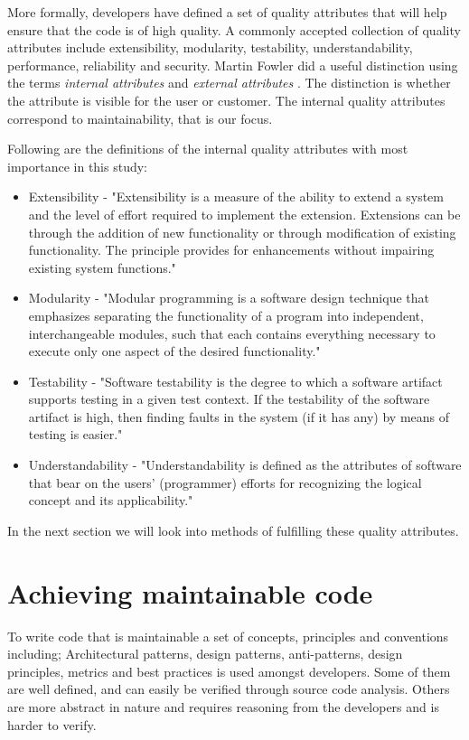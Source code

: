 \documentclass{report}
\begin{document}
More formally, developers have defined a set of quality attributes that will help ensure that the code is of high quality. A commonly accepted collection of quality attributes include extensibility, modularity, testability, understandability, performance, reliability and security. Martin Fowler did a useful distinction using the terms \textit{internal attributes} and \textit{external attributes} \cite{internalExternal}. The distinction is whether the attribute is visible for the user or customer. The internal quality attributes correspond to maintainability, that is our focus. 

Following are the definitions of the internal quality attributes with most importance in this study:
\begin{itemize}
	\item Extensibility - "Extensibility is a measure of the ability to extend a system and the level of effort required to implement the extension. Extensions can be through the addition of new functionality or through modification of existing functionality. The principle provides for enhancements without impairing existing system functions." \cite{Extensib83:online}
    	\item Modularity - "Modular programming is a software design technique that emphasizes separating the functionality of a program into independent, interchangeable modules, such that each contains everything necessary to execute only one aspect of the desired functionality." \cite{Modularp60:online}
	\item Testability - "Software testability is the degree to which a software artifact supports testing in a given test context. If the testability of the software artifact is high, then finding faults in the system (if it has any) by means of testing is easier." \cite{Software40:online}
	\item Understandability - "Understandability is defined as the attributes of software that bear on the users' (programmer) efforts for recognizing the logical concept and its applicability." \cite{Understa26:online}
\end{itemize}

In the next section we will look into methods of fulfilling these quality attributes.

\section{Achieving maintainable code}
To write code that is maintainable a set of concepts, principles and conventions including; Architectural patterns, design patterns, anti-patterns, design principles, metrics and best practices is used amongst developers. Some of them are well defined, and can easily be verified through source code analysis. Others are more abstract in nature and requires reasoning from the developers and is harder to verify.
\end{document}
